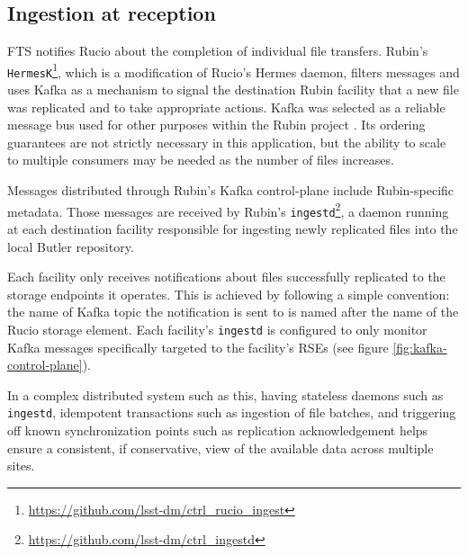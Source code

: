 \documentclass{webofc}
\begin{document}
\subsection{Ingestion at reception}
\label{ingestion}

FTS notifies Rucio about the completion of individual file transfers. Rubin's \texttt{HermesK}\footnote{\url{https://github.com/lsst-dm/ctrl_rucio_ingest}}, which is a modification of Rucio's Hermes daemon, filters messages and uses Kafka as a mechanism to signal the destination Rubin facility that a new file was replicated and to take appropriate actions. Kafka was selected as a reliable message bus used for other purposes within the Rubin project \citep[see e.g.,][]{2024SPIE13101E..1MF,2024SPIE13101E..18R}. Its ordering guarantees are not strictly necessary in this application, but the ability to scale to multiple consumers may be needed as the number of files increases.

Messages distributed through Rubin's Kafka control-plane include Rubin-specific metadata. Those messages are received by Rubin's \texttt{ingestd}\footnote{\url{https://github.com/lsst-dm/ctrl_ingestd}}, a daemon running at each destination facility responsible for ingesting newly replicated files into the local Butler repository.

Each facility only receives notifications about files successfully replicated to the storage endpoints it operates. This is achieved by following a simple convention: the name of Kafka topic the notification is sent to is named after the name of the Rucio storage element. Each facility's \texttt{ingestd} is configured to only monitor Kafka messages specifically targeted to the facility's RSEs (see figure \ref{fig:kafka-control-plane}).

In a complex distributed system such as this, having stateless daemons such as \texttt{ingestd}, idempotent transactions such as ingestion of file batches, and triggering off known synchronization points such as replication acknowledgement helps ensure a consistent, if conservative, view of the available data across multiple sites.
\end{document}
